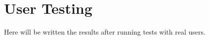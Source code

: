 
\chapter{User Testing}
\label{Chapter3}

Here will be written the results after running tests with real users.
